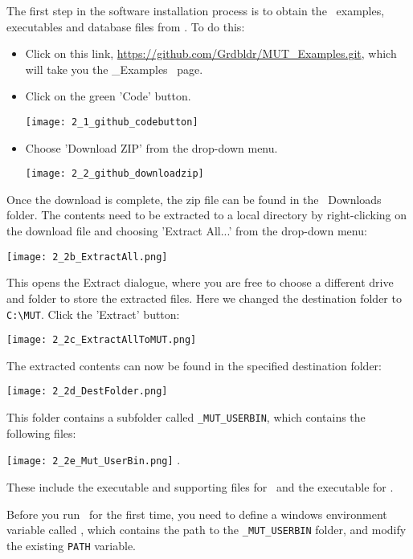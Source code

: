 \label{chapter:Installation}
The first step in the software installation process is to obtain the \mut\ examples, executables and database files from
\github.  To do this:
\begin{itemize}
     \item Click on this link, \url{https://github.com/Grdbldr/MUT_Examples.git}, which will take you the \mut\_Examples \github\ page.
     \item Click on the green 'Code' button.

        \texttt{[image: 2\_1\_github\_codebutton]}

     \item Choose 'Download ZIP' from the drop-down menu.

        \texttt{[image: 2\_2\_github\_downloadzip]}

\end{itemize}

Once the download is complete, the zip file can be found in the \windows\ Downloads folder.  The contents need to be extracted to a local directory by right-clicking on the download file and choosing 'Extract All...' from the drop-down menu:

        \texttt{[image: 2\_2b\_ExtractAll.png]}

This opens the Extract dialogue, where you are free to choose a different drive and folder to store the extracted files.  Here we changed the destination folder to \verb+C:\MUT+.  Click the 'Extract' button:

        \texttt{[image: 2\_2c\_ExtractAllToMUT.png]}

The extracted contents can now be found in the specified destination folder:

        \texttt{[image: 2\_2d\_DestFolder.png]}

This folder contains a subfolder called \texttt{\_MUT\_USERBIN}, which contains the following files:


        \texttt{[image: 2\_2e\_Mut\_UserBin.png]} \label{page:userbin}
        \label{page:userbin}.


These include the executable and supporting files for \mut\ and the executable for \mfus.

Before you run \mut\ for the first time, you need to define a windows environment variable called \bin, which contains the path to the \texttt{\_MUT\_USERBIN} folder, and modify the existing \texttt{PATH} variable.

